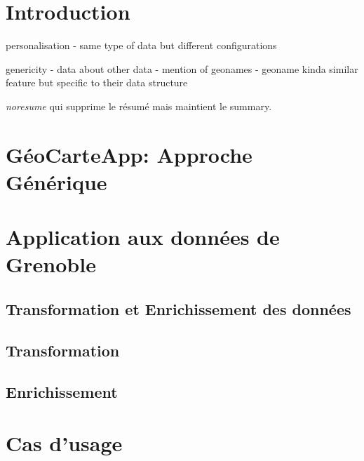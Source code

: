 \documentclass[a4paper,pagenum,french,showlayout]{rnti}
\affiliation{
    \affil{1}Univ Lyon, MINES Saint-\'Etienne, CNRS, Laboratoire Hubert Curien UMR 5516, \\F-42023 Saint-\'Etienne, France\\
          \{prenom.nom\}@emse.fr\\
    \affil{2}Mondeca, \\ 35 boulevard Strasbourg, Paris, France\\
          ghislain.atemezing@mondeca.com\\
 }
\begin{document}
%
\section{Introduction}

personalisation
- same type of data but different configurations

genericity
- data about other data
- mention of geonames
    - geoname kinda similar feature but specific to their data structure
    
\textit{noresume} qui supprime le résumé mais maintient le summary.

\section{GéoCarteApp: Approche Générique}

\section{Application aux données de Grenoble}

\subsection{Transformation et Enrichissement des données}

\subsection{Transformation}

\subsection{Enrichissement}


\section{Cas d'usage}
\end{document}
